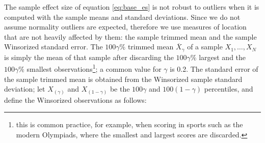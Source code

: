 \documentclass[a4paper]{book}
\begin{document}
The sample effect size of equation \ref{eq:base_es} is not robust to outliers when it is computed with the sample means and standard deviations. Since we do not assume normality outliers are expected, therefore we use measures of location that are not heavily affected by them: the sample trimmed mean and the sample Winsorized standard error. The $100\gamma \%$ trimmed mean $\overline{X}_\gamma$ of a sample $X_1,\ldots,X_N$ is simply the mean of that sample after discarding the $100\gamma\%$ largest and the $100\gamma\%$ smallest observations\footnote{this is common practice, for example, when scoring in sports such as the modern Olympiads, where the smallest and largest scores are discarded.}; a common value for $\gamma$ is 0.2. The standard error of the sample trimmed mean is obtained from the Winsorized sample standard deviation; let $X_{(\gamma)}$ and $X_{(1-\gamma)}$ be the $100\gamma$ and $100(1-\gamma)$ percentiles, and define the Winsorized observations as follows:
\end{document}
